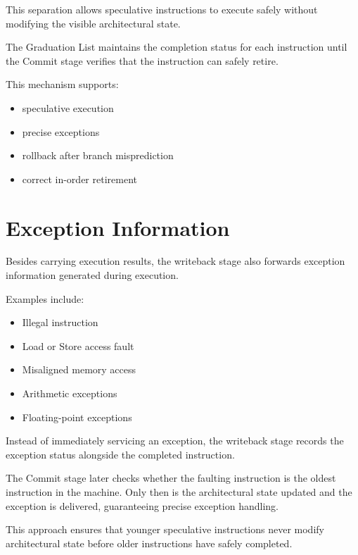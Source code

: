 This separation allows speculative instructions to execute safely without modifying the visible
architectural state.

The Graduation List maintains the completion status for each instruction until the Commit stage
verifies that the instruction can safely retire.

This mechanism supports:
\begin{itemize}
  \item speculative execution
  \item precise exceptions
  \item rollback after branch misprediction
  \item correct in-order retirement
\end{itemize}

\begin{rtlrefs}
\end{rtlrefs}

\section{Exception Information}

Besides carrying execution results, the writeback stage also forwards exception information
generated during execution.

Examples include:
\begin{itemize}
  \item Illegal instruction
  \item Load or Store access fault
  \item Misaligned memory access
  \item Arithmetic exceptions
  \item Floating-point exceptions
\end{itemize}

Instead of immediately servicing an exception, the writeback stage records the exception status
alongside the completed instruction.

The Commit stage later checks whether the faulting instruction is the oldest instruction in the
machine. Only then is the architectural state updated and the exception is delivered,
guaranteeing precise exception handling.

This approach ensures that younger speculative instructions never modify architectural state
before older instructions have safely completed.

\begin{rtlrefs}
\end{rtlrefs}
